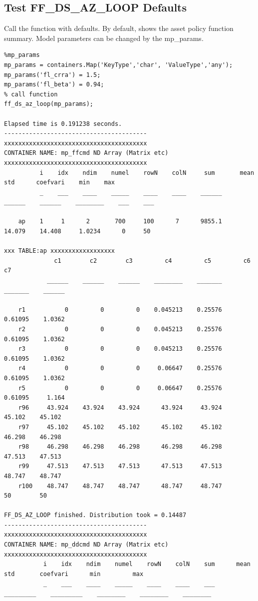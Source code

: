 \documentclass[
]{book}
\begin{document}
\hypertarget{test-ff_ds_az_loop-defaults}{%
\subsection{Test FF\_DS\_AZ\_LOOP Defaults}\label{test-ff_ds_az_loop-defaults}}

Call the function with defaults. By default, shows the asset policy
function summary. Model parameters can be changed by the mp\_params.

\begin{verbatim}
%mp_params
mp_params = containers.Map('KeyType','char', 'ValueType','any');
mp_params('fl_crra') = 1.5;
mp_params('fl_beta') = 0.94;
% call function
ff_ds_az_loop(mp_params);

Elapsed time is 0.191238 seconds.
----------------------------------------
xxxxxxxxxxxxxxxxxxxxxxxxxxxxxxxxxxxxxxxx
CONTAINER NAME: mp_ffcmd ND Array (Matrix etc)
xxxxxxxxxxxxxxxxxxxxxxxxxxxxxxxxxxxxxxxx
          i    idx    ndim    numel    rowN    colN     sum       mean      std      coefvari    min    max
          _    ___    ____    _____    ____    ____    ______    ______    ______    ________    ___    ___

    ap    1     1      2       700     100      7      9855.1    14.079    14.408     1.0234      0     50 

xxx TABLE:ap xxxxxxxxxxxxxxxxxx
              c1        c2        c3         c4         c5         c6         c7  
            ______    ______    ______    ________    _______    _______    ______

    r1           0         0         0    0.045213    0.25576    0.61095    1.0362
    r2           0         0         0    0.045213    0.25576    0.61095    1.0362
    r3           0         0         0    0.045213    0.25576    0.61095    1.0362
    r4           0         0         0     0.06647    0.25576    0.61095    1.0362
    r5           0         0         0     0.06647    0.25576    0.61095     1.164
    r96     43.924    43.924    43.924      43.924     43.924     45.102    45.102
    r97     45.102    45.102    45.102      45.102     45.102     46.298    46.298
    r98     46.298    46.298    46.298      46.298     46.298     47.513    47.513
    r99     47.513    47.513    47.513      47.513     47.513     48.747    48.747
    r100    48.747    48.747    48.747      48.747     48.747         50        50

FF_DS_AZ_LOOP finished. Distribution took = 0.14487
----------------------------------------
xxxxxxxxxxxxxxxxxxxxxxxxxxxxxxxxxxxxxxxx
CONTAINER NAME: mp_ddcmd ND Array (Matrix etc)
xxxxxxxxxxxxxxxxxxxxxxxxxxxxxxxxxxxxxxxx
           i    idx    ndim    numel    rowN    colN    sum      mean          std       coefvari      min         max   
           _    ___    ____    _____    ____    ____    ___    _________    _________    ________    ________    ________


\end{verbatim}
\end{document}
